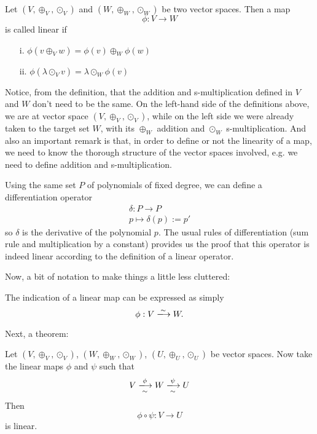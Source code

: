\begin{definition}
    Let $(V, \oplus_V, \odot_V)$ and $(W, \oplus_W, \odot_W)$ be two vector spaces. Then a map
    \[
        \phi : V \longrightarrow W
    \]
    is called linear if
    \begin{itemize}
        \item[i.] $\phi(v \oplus_V w) = \phi(v) \oplus_W \phi(w)$ 
        \item[ii.] $\phi(\lambda \odot_V v) = \lambda \odot_W \phi(v)$
    \end{itemize}
\end{definition}

Notice, from the definition, that the addition and s-multiplication defined in $V$ and $W$ don't need to be the same. On the left-hand side of the definitions above, we are at vector space $(V, \oplus_V, \odot_V)$, while on the left side we were already taken to the target set $W$, with its $\oplus_W$ addition and $\odot_W$ s-multiplication. And also an important remark is that, in order to define or not the linearity of a map, we need to know the thorough structure of the vector spaces involved, e.g. we need to define addition and s-multiplication.

\begin{example}
    Using the same set $P$ of polynomials of fixed degree, we can define a differentiation operator
    \begin{align*}
        \delta: P \longrightarrow P \\
        p \longmapsto \delta(p) := p'
    \end{align*}
    so $\delta$ is the derivative of the polynomial $p$. The usual rules of differentiation (sum rule and multiplication by a constant) provides us the proof that this operator is indeed linear according to the definition of a linear operator.
    \qedwhite
\end{example}

Now, a bit of notation to make things a little less cluttered:

\begin{notation}
    The indication of a linear map can be expressed as simply
    \[
        \phi : V \xlongrightarrow[]{\sim} W.
    \]
\end{notation}

Next, a theorem:
\begin{theorem}
    Let $(V, \oplus_V, \odot_V)$, $(W, \oplus_W, \odot_W)$, $(U, \oplus_U, \odot_U)$ be vector spaces. Now take the linear maps $\phi$ and $\psi$ such that
    \[
        V \xlongrightarrow[\sim]{\phi} W \xlongrightarrow[\sim]{\psi} U
    \]
    Then 
    \[
        \phi \circ \psi : V \longrightarrow U
    \] 
    is linear.
\end{theorem}


